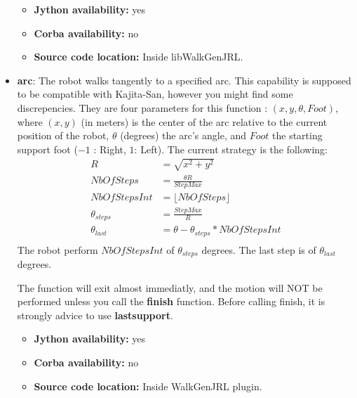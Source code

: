 \begin{itemize}
\begin{itemize}
\item \textbf{Jython availability:} yes
\item \textbf{Corba availability:} no
\item \textbf{Source code location:} Inside libWalkGenJRL.
\end{itemize}

\item {\bf arc}: The robot walks tangently to a specified arc.
This capability is supposed to be compatible with Kajita-San, however you might find 
some discrepencies. They are four parameters for this function : $(x,y,\theta,Foot)$,
where $(x,y)$ (in meters) is the center of the arc relative to the current position of the robot,
$\theta$ (degrees) the arc's angle, and $Foot$ the starting support foot ($-1$ : Right, $1$: Left).
The current strategy is the following:
\begin{equation}
\begin{aligned}
R &= \sqrt{x^2+y^2} \\
NbOfSteps &= \frac{\theta R }{StepMax} \\
NbOfStepsInt &= \lfloor NbOfSteps \rfloor \\
\theta_{steps} &= \frac{StepMax}{R} \\
\theta_{last} &= \theta - \theta_{steps} * NbOfStepsInt \\
\end{aligned}
\end{equation}
The robot perform $NbOfStepsInt$ of $\theta_{steps}$ degrees.
The last step is of $\theta_{last}$ degrees.
\par
The function will exit almost immediatly, and the motion will NOT
be performed unless you call the {\bf finish} function.
Before calling finish, it is strongly advice to use {\bf lastsupport}.
\begin{itemize}
\item \textbf{Jython availability:} yes
\item \textbf{Corba availability:} no
\item \textbf{Source code location:} Inside WalkGenJRL plugin.
\end{itemize}


\end{itemize}
